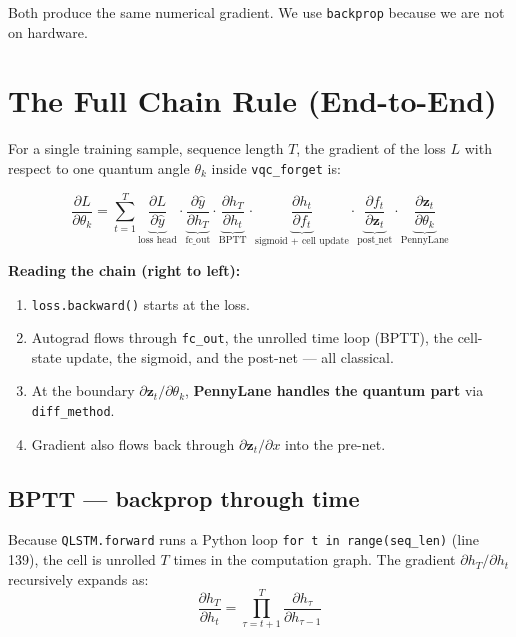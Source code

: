 \documentclass[11pt,a4paper]{article}
\begin{document}
Both produce the same numerical gradient. We use \texttt{backprop} because we are not on hardware.

\section{The Full Chain Rule (End-to-End)}

For a single training sample, sequence length $T$, the gradient of the loss
$L$ with respect to one quantum angle $\theta_k$ inside \texttt{vqc\_forget} is:

\[
  \frac{\partial L}{\partial \theta_k} = \sum_{t=1}^{T}
  \underbrace{\frac{\partial L}{\partial \hat{y}}}_{\text{loss head}}
  \cdot \underbrace{\frac{\partial \hat{y}}{\partial h_T}}_{\text{fc\_out}}
  \cdot \underbrace{\frac{\partial h_T}{\partial h_t}}_{\text{BPTT}}
  \cdot \underbrace{\frac{\partial h_t}{\partial f_t}}_{\text{sigmoid + cell update}}
  \cdot \underbrace{\frac{\partial f_t}{\partial \mathbf{z}_t}}_{\text{post\_net}}
  \cdot \underbrace{\frac{\partial \mathbf{z}_t}{\partial \theta_k}}_{\text{PennyLane}}
\]

\textbf{Reading the chain (right to left):}
\begin{enumerate}
  \item \texttt{loss.backward()} starts at the loss.
  \item Autograd flows through \texttt{fc\_out}, the unrolled time loop (BPTT), the cell-state update, the sigmoid, and the post-net --- all classical.
  \item At the boundary $\partial \mathbf{z}_t / \partial \theta_k$, \textbf{PennyLane handles the quantum part} via \texttt{diff\_method}.
  \item Gradient also flows back through $\partial \mathbf{z}_t / \partial x$ into the pre-net.
\end{enumerate}

\subsection{BPTT --- backprop through time}

Because \texttt{QLSTM.forward} runs a Python loop \texttt{for t in range(seq\_len)} (line 139), the cell is unrolled $T$ times in the computation graph. The gradient $\partial h_T / \partial h_t$ recursively expands as:
\[
  \frac{\partial h_T}{\partial h_t} = \prod_{\tau=t+1}^{T} \frac{\partial h_\tau}{\partial h_{\tau-1}}
\]
\end{document}
